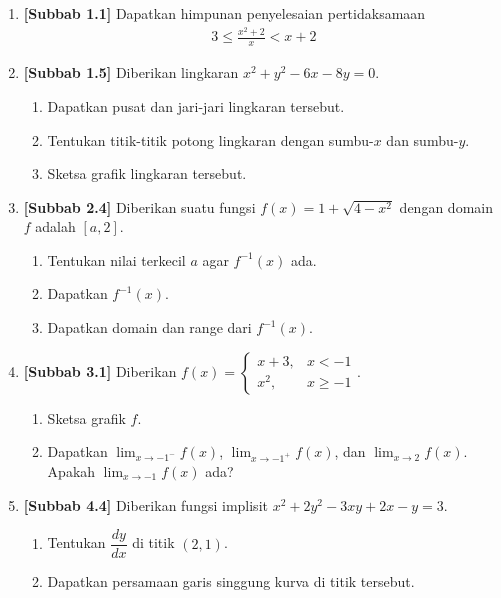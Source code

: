 \documentclass[10pt,openany,a4paper]{article}
\theoremstyle{definition}
\theoremstyle{definition}
\theoremstyle{plain}
\begin{document}
\begin{enumerate}
    \item \textbf{[Subbab 1.1]} Dapatkan himpunan penyelesaian pertidaksamaan
    \begin{align*}
        3\leq\frac{x^2+2}{x}<x+2
    \end{align*}

    \item \textbf{[Subbab 1.5]} Diberikan lingkaran $x^2+y^2-6x-8y=0$.
    \begin{enumerate}
        \item Dapatkan pusat dan jari-jari lingkaran tersebut.
        \item Tentukan titik-titik potong lingkaran dengan sumbu-$x$ dan sumbu-$y$.
        \item Sketsa grafik lingkaran tersebut.
    \end{enumerate}

    \item \textbf{[Subbab 2.4]} Diberikan suatu fungsi $f(x)=1+\sqrt{4-x^2}$ dengan domain $f$ adalah $[a,2]$.
    \begin{enumerate}
        \item Tentukan nilai terkecil $a$ agar $f^{-1}(x)$ ada.
        \item Dapatkan $f^{-1}(x)$.
        \item Dapatkan domain dan range dari $f^{-1}(x)$.
    \end{enumerate}

    \item \textbf{[Subbab 3.1]} Diberikan $f(x)=\begin{cases}
        x+3, & x<-1\\
        x^2, & x\geq -1
    \end{cases}$.
    \begin{enumerate}
        \item Sketsa grafik $f$.
        \item Dapatkan $\displaystyle\lim_{x\to-1^-}f(x)$, $\displaystyle\lim_{x\to-1^+}f(x)$, dan $\displaystyle\lim_{x\to 2}f(x)$. Apakah $\displaystyle\lim_{x\to-1}f(x)$ ada?
    \end{enumerate}

    \item \textbf{[Subbab 4.4]} Diberikan fungsi implisit $x^2+2y^2-3xy+2x-y=3$.
    \begin{enumerate}
        \item Tentukan $\dfrac{dy}{dx}$ di titik $(2,1)$.
        \item Dapatkan persamaan garis singgung kurva di titik tersebut.
    \end{enumerate}
\end{enumerate}
\end{document}
